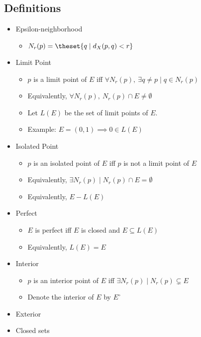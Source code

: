 \hypertarget{definitions-1}{%
\subsection{Definitions}\label{definitions-1}}


\begin{itemize}
\item
  Epsilon-neighborhood

  \begin{itemize}
  \tightlist
  \item
    \(N_r(p) = \theset{q \mid d_X(p,q) < r}\)
  \end{itemize}
\item
  Limit Point

  \begin{itemize}
  \tightlist
  \item
    \(p\) is a limit point of \(E\) iff
    \(\forall N_r(p),~ \exists q\neq p \mid q \in N_r(p)\)
  \item
    Equivalently, \(\forall N_r(p),~ N_r(p) \cap E \neq \emptyset\)
  \item
    Let \(L(E)\) be the set of limit points of \(E\).
  \item
    Example: \(E = (0,1) \implies 0 \in L(E)\)
  \end{itemize}
\item
  Isolated Point

  \begin{itemize}
  \tightlist
  \item
    \(p\) is an isolated point of \(E\) iff \(p\) is not a limit point
    of \(E\)
  \item
    Equivalently, \(\exists N_r(p) \mid N_r(p) \cap E = \emptyset\)
  \item
    Equivalently, \(E - L(E)\)
  \end{itemize}
\item
  Perfect

  \begin{itemize}
  \tightlist
  \item
    \(E\) is perfect iff \(E\) is closed and \(E \subseteq L(E)\)
  \item
    Equivalently, \(L(E) = E\)
  \end{itemize}
\item
  Interior

  \begin{itemize}
  \tightlist
  \item
    \(p\) is an interior point of \(E\) iff
    \(\exists N_r(p) \mid N_r(p) \subsetneq E\)
  \item
    Denote the interior of \(E\) by \(E^\circ\)
  \end{itemize}
\item
  Exterior
\item
  Closed sets


\end{itemize}
